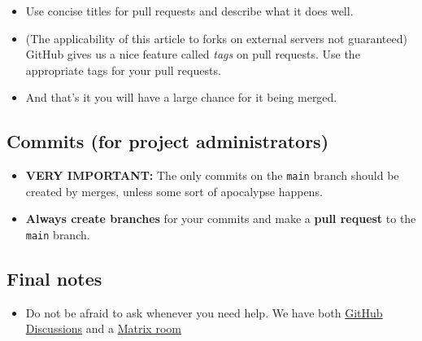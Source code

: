 \begin{itemize}
\tightlist
\item
  Use concise titles for pull requests and describe what it does well.
\item
  (The applicability of this article to forks on external servers not
  guaranteed) GitHub gives us a nice feature called \emph{tags} on pull
  requests. Use the appropriate tags for your pull requests.
\item
  And that's it you will have a large chance for it being merged.
\end{itemize}

\subsection{Commits (for project
administrators)}\label{commits-for-project-administrators}

\begin{itemize}
\tightlist
\item
  \textbf{VERY IMPORTANT:} The only commits on the \texttt{main} branch
  should be created by merges, unless some sort of apocalypse happens.
\item
  \textbf{Always create branches} for your commits and make a
  \textbf{pull request} to the \texttt{main} branch.
\end{itemize}

\subsection{Final notes}\label{final-notes}

\begin{itemize}
\tightlist
\item
  Do not be afraid to ask whenever you need help. We have both
  \href{https://github.com/Sparkles-Laurel/lament/discussions/10}{GitHub
  Discussions} and a
  \href{https://matrix.to/\#/\#lament-contrib:platypus-sandbox.com}{Matrix
  room}
\end{itemize}
